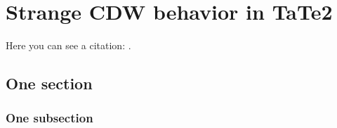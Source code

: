 \chapter{Strange CDW behavior in TaTe2}
Here you can see a citation: \cite{atc13}.

\lipsum[7]

\section{One section}

\lipsum[3]

\subsection{One subsection}

\lipsum[3]
